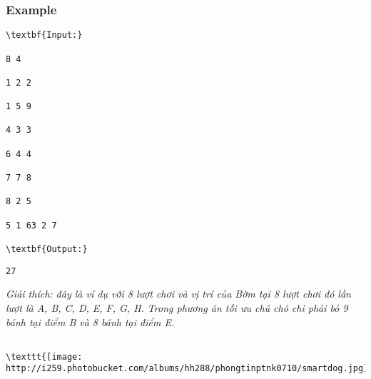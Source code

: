 \subsubsection{   Example  }
\begin{verbatim}
\textbf{Input:}

8 4

1 2 2

1 5 9

4 3 3

6 4 4

7 7 8

8 2 5

5 1 63 2 7

\textbf{Output:}\end{verbatim}
\begin{verbatim}
27\end{verbatim}

\emph{    Giải thích: đây là ví dụ với 8 lượt chơi và vị trí của Bờm tại 8 lượt chơi đó lần lượt là A, B, C, D, E, F, G, H. Trong phương án tối ưu chú chó chỉ phải bỏ 9 bánh tại điểm B và 8 bánh tại điểm E.   }
\begin{verbatim}

\texttt{[image: http://i259.photobucket.com/albums/hh288/phongtinptnk0710/smartdog.jpg]}\end{verbatim}
